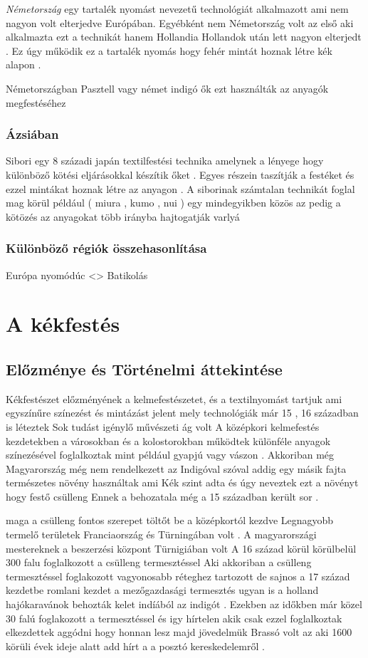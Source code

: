 \documentclass[fontsize=12pt, appendixprefix=true]{scrreprt}
\begin{document}
\textit{Németország} 
egy tartalék nyomást nevezetű technológiát  alkalmazott  ami  nem nagyon volt elterjedve Európában.
 Egyébként nem Németország volt az első aki alkalmazta  ezt a technikát  hanem Hollandia 
 Hollandok után  lett nagyon elterjedt .
 Ez úgy működik  ez a tartalék nyomás hogy fehér mintát hoznak létre  kék alapon .

 Németországban Pasztell vagy német indigó ők ezt használták az anyagók megfestéséhez 


\subsection{Ázsiában}
Sibori egy 8 századi japán textilfestési technika amelynek a lényege hogy különböző kötési eljárásokkal készítik őket .
Egyes részein taszítják a festéket és ezzel mintákat hoznak létre az anyagon .
A siborinak számtalan technikát foglal mag körül   például ( miura , kumo  , nui  ) egy mindegyikben közös az pedig a kötözés az anyagokat több irányba hajtogatják 
varlyá


\subsection{Különböző régiók összehasonlítása}
   Európa nyomódúc <> Batikolás
\chapter{A kékfestés}
\section{Előzménye és Történelmi áttekintése}
Kékfestészet előzményének a kelmefestészetet, és a textilnyomást tartjuk ami egyszínűre színezést és mintázást jelent  mely technológiák már 15 , 16 században is léteztek 
Sok tudást igénylő művészeti ág volt
A középkori kelmefestés kezdetekben a városokban és a kolostorokban működtek különféle anyagok színezésével foglalkoztak mint például gyapjú vagy vászon . 
Akkoriban még Magyarország még nem rendelkezett az Indigóval szóval addig egy másik fajta természetes növény használtak ami  Kék szint adta és úgy neveztek ezt a növényt hogy festő csülleng 
 Ennek a behozatala még a 15 században került sor .

 maga a csülleng fontos szerepet töltőt be a középkortól kezdve 
 Legnagyobb termelő területek Franciaország és Türningában volt .
 A magyarországi mestereknek a beszerzési központ Türnigiában volt 
 A 16 század körül körülbelül 300 falu foglalkozott a csülleng termesztéssel 
 Aki akkoriban a csülleng termesztéssel foglakozott vagyonosabb réteghez tartozott
 de sajnos a 17 század kezdetbe romlani kezdet a mezőgazdasági termesztés ugyan is a holland hajókaravánok behozták kelet indíából az indigót .
 Ezekben az időkben már közel 30 falú foglakozott a termesztéssel és igy hírtelen akik csak ezzel foglalkoztak elkezdettek aggódni hogy honnan lesz majd jövedelmük 
 Brassó volt az  aki 1600 körüli évek ideje alatt add hírt a a posztó kereskedelemről .
\end{document}

